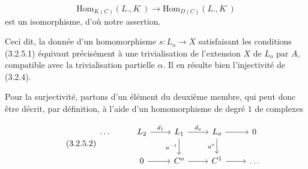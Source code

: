 \begin{equation*}
\mathrm{Hom}_{K(\underline{C})}(L.,K^{\cdot}) \longrightarrow \mathrm{Hom}_{D(\underline{C})}(L.,K^{\cdot})
\end{equation*}
est un isomorphisme, d'où notre assertion.

Ceci dit, la donnée d'un homomorphisme $s : L_o \longrightarrow X$ satisfaisant les conditions (3.2.5.1) équivaut précisément à une trivialisation de l'extension $X$ de $L_o$ par $A$, compatible avec la trivialisation partielle $\alpha$. Il en résulte bien l'injectivité de (3.2.4).

Pour la surjectivité, partons d'un élément du deuxième membre, qui peut donc être décrit, par définition, à l'aide d'un homomorphisme de degré $1$ de complexes

\begin{equation}\tag{3.2.5.2}
\begin{tikzcd}
\ldots & L_2 \arrow[r, "d_1"] & L_1 \arrow[r, "d_o"] \arrow[d, "u^{-1}"'] & L_o \arrow[r] \arrow[d, "u^o"'] & 0 \\
 & 0 \arrow[r] & C^o \arrow[r] & C^1 \arrow[r] & \ldots
\end{tikzcd}
\end{equation}
